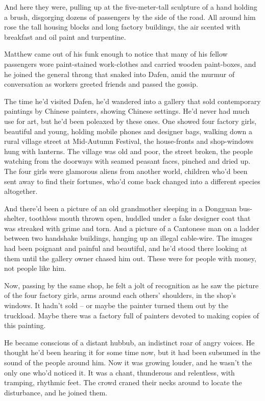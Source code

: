 And here they were, pulling up at the five-meter-tall sculpture of
a hand holding a brush, disgorging dozens of passengers by the side
of the road. All around him rose the tall housing blocks and long
factory buildings, the air scented with breakfast and oil paint and
turpentine.

Matthew came out of his funk enough to notice that many of his
fellow passengers wore paint-stained work-clothes and carried
wooden paint-boxes, and he joined the general throng that snaked
into Dafen, amid the murmur of conversation as workers greeted
friends and passed the gossip.

The time he'd visited Dafen, he'd wandered into a gallery that sold
contemporary paintings by Chinese painters, showing Chinese
settings. He'd never had much use for art, but he'd been poleaxed
by these ones. One showed four factory girls, beautiful and young,
holding mobile phones and designer bags, walking down a rural
village street at Mid-Autumn Festival, the house-fronts and
shop-windows hung with lanterns. The village was old and poor, the
street broken, the people watching from the doorways with seamed
peasant faces, pinched and dried up. The four girls were glamorous
aliens from another world, children who'd been sent away to find
their fortunes, who'd come back changed into a different species
altogether.

And there'd been a picture of an old grandmother sleeping in a
Dongguan bus-shelter, toothless mouth thrown open, huddled under a
fake designer coat that was streaked with grime and torn. And a
picture of a Cantonese man on a ladder between two handshake
buildings, hanging up an illegal cable-wire. The images had been
poignant and painful and beautiful, and he'd stood there looking at
them until the gallery owner chased him out. These were for people
with money, not people like him.

Now, passing by the same shop, he felt a jolt of recognition as he
saw the picture of the four factory girls, arms around each others'
shoulders, in the shop's windows. It hadn't sold -- or maybe the
painter turned them out by the truckload. Maybe there was a factory
full of painters devoted to making copies of this painting.

He became conscious of a distant hubbub, an indistinct roar of
angry voices. He thought he'd been hearing it for some time now,
but it had been subsumed in the sound of the people around him. Now
it was growing louder, and he wasn't the only one who'd noticed it.
It was a chant, thunderous and relentless, with tramping, rhythmic
feet. The crowd craned their necks around to locate the
disturbance, and he joined them.

